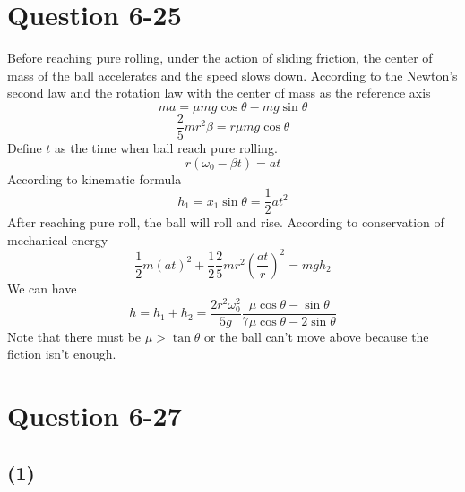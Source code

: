 \documentclass[12pt,a4paper]{article}%
\begin{document}
	\section{Question 6-25}
	Before reaching pure rolling, under the action of sliding friction, the center of mass of the ball accelerates and the speed slows down. According to the Newton's second law and the rotation law with the center of mass as the reference axis
	\begin{equation}
		ma=\mu mg\cos\theta-mg\sin\theta
	\end{equation}
	\begin{equation}
		\frac{2}{5}mr^2\beta=r\mu mg\cos\theta 
	\end{equation}
	Define $t$ as the time when ball reach pure rolling.
	\begin{equation}
		r(\omega_0-\beta t)=at
	\end{equation}
	According to kinematic formula
	\begin{equation}
		h_1=x_1\sin\theta=\frac{1}{2}at^2
	\end{equation}
	After reaching pure roll, the ball will roll and rise. According to conservation of mechanical energy
	\begin{equation}
		\frac{1}{2}m(at)^2+\frac{1}{2}\frac{2}{5}mr^2(\frac{at}{r})^2=mgh_2
	\end{equation}
	We can have
	$$
	h=h_1+h_2=\frac{2r^2\omega_0^2}{5g}\frac{\mu\cos\theta-\sin\theta}{7\mu\cos\theta-2\sin\theta}
	$$
	Note that there must be $\mu>\tan\theta$ or the ball can't move above because the fiction isn't enough.
	\section{Question 6-27}
	\subsection*{(1)}
\end{document}
